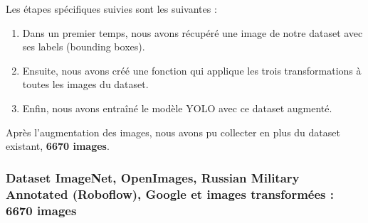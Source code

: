 \noindent Les étapes spécifiques suivies sont les suivantes :

\begin{enumerate}
    \item Dans un premier temps, nous avons récupéré une image de notre dataset avec ses labels (bounding boxes).
    \item Ensuite, nous avons créé une fonction qui applique les trois transformations à toutes les images du dataset.
    \item Enfin, nous avons entraîné le modèle YOLO avec ce dataset augmenté.
\end{enumerate}

Après l'augmentation des images, nous avons pu collecter en plus du dataset existant, \textbf{6670 images}.


\subsubsection*{Dataset ImageNet, OpenImages, Russian Military Annotated (Roboflow), Google et images transformées : 6670 images}

